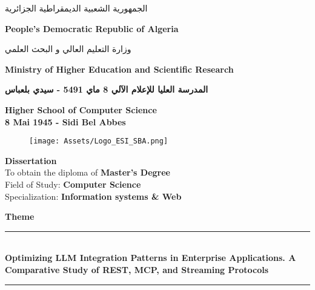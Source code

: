 \begin{titlepage}

\centering
\begin{Arabic}
    {\normalsize \textsc{الجمهورية الشعبية الديمقراطية الجزائرية}} \\[1mm]
\end{Arabic}
{\normalsize \textbf{People's Democratic Republic of Algeria}} \\[1mm]

\begin{Arabic}
    {\normalsize \textsc{وزارة التعليم العالي و البحث العلمي}} \\[1mm]
\end{Arabic}
{\normalsize \textbf{Ministry of Higher Education and Scientific Research}}\\

\begin{Arabic}
    {\normalsize \textbf{المدرسة العليا للإعلام الآلي \hspace{0.3mm} 8 ماي 5491 - سيدي بلعباس}}\\[1mm]
\end{Arabic}
{\normalsize \textbf{Higher School of Computer Science \\[1mm] 8 Mai 1945 - Sidi Bel Abbes}}\\

\vspace{0.5cm}


\begin{figure}[ht]
    \centering
    \texttt{[image: Assets/Logo\_ESI\_SBA.png]}
\end{figure}

\vspace{0.3cm}

\Large \textbf{Dissertation} \\
\vspace{0.4cm}
{\normalsize To obtain the diploma of \textbf{Master's Degree}} \\
{\normalsize Field of Study: \textbf{Computer Science}} \\
{\normalsize Specialization: \textbf{Information systems \& Web}} \\
\vspace{0.4cm}

\Large \textbf{Theme}\\
\rule{15cm}{0.2mm}\\
\vspace{0.4cm}
\centering
{\textbf{Optimizing LLM Integration Patterns in Enterprise Applications. A Comparative Study of REST, MCP, and Streaming Protocols}}\\
\rule{15cm}{0.2mm}\\
\vspace{0.2cm}


\end{titlepage}
